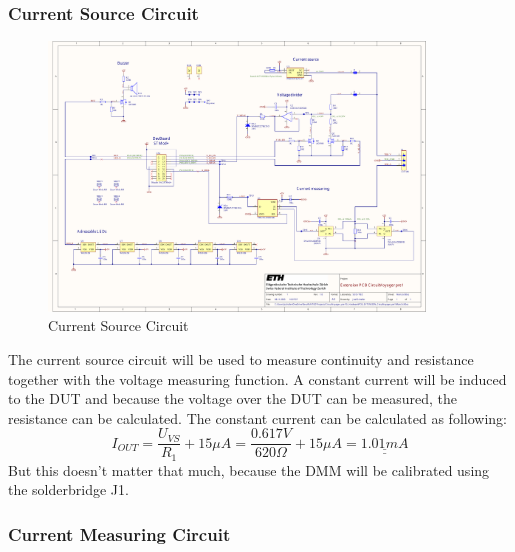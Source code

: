 \subsubsection{Current Source Circuit}

\begin{figure}[H]
	\centering
	\includegraphics[width=10cm, trim={20cm 23cm 10cm 1cm}, clip]{../../../5_Hardware/PCB_EXTENSION_CircuitVoyager_pre1/Project Outputs for PCB_EXT_CV_PRE1/Schematic_PCB_EXTENSION_CircuitVoyager_pre1.pdf}
	\caption{Current Source Circuit}
	\label{fig:Current Source Circuit}
\end{figure}

The current source circuit will be used to measure continuity and resistance together with the voltage measuring function. A constant current will be induced to the DUT and because the voltage over the DUT can be measured, the resistance can be calculated. The constant current can be calculated as following:
\[I_{OUT} = \frac{U_{VS}}{R_1} + 15\mu A = \frac{0.617V}{620\Omega} + 15\mu A = \underline{\underline{1.01mA}}\]
But this doesn't matter that much, because the DMM will be calibrated using the solderbridge J1.


\subsubsection{Current Measuring Circuit}


